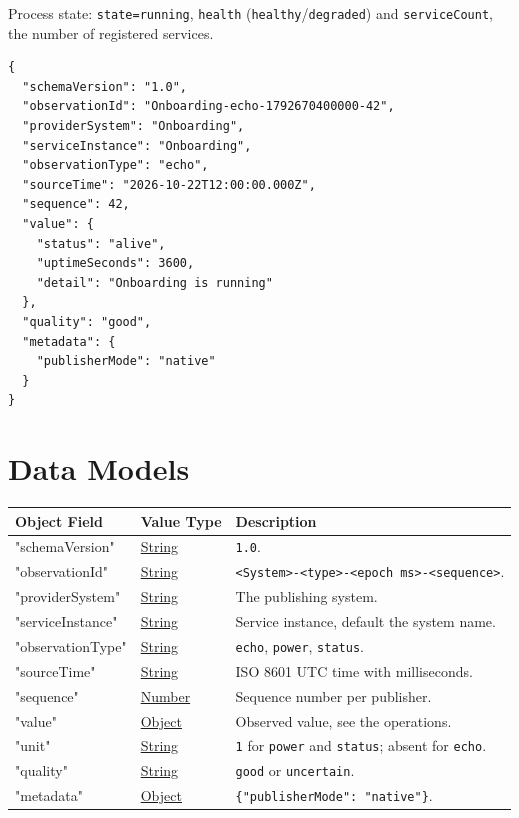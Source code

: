 \documentclass[a4paper]{arrowhead}
\newcommand{\oref}[1]{{\textcolor{ArrowheadBlue}{\hyperref[sec:operations:#1]{#1}}}}
\newcommand{\pref}[1]{{\textcolor{ArrowheadGrey}{\hyperref[sec:model:primitives:#1]{#1}}}}
\begin{document}
Process state: \texttt{state=\allowbreak{}running}, \texttt{health} (\texttt{healthy}/\texttt{degraded}) and \texttt{serviceCount}, the number of registered services.

\begin{lstlisting}[caption={An \oref{echo} observation.}]
{
  "schemaVersion": "1.0",
  "observationId": "Onboarding-echo-1792670400000-42",
  "providerSystem": "Onboarding",
  "serviceInstance": "Onboarding",
  "observationType": "echo",
  "sourceTime": "2026-10-22T12:00:00.000Z",
  "sequence": 42,
  "value": {
    "status": "alive",
    "uptimeSeconds": 3600,
    "detail": "Onboarding is running"
  },
  "quality": "good",
  "metadata": {
    "publisherMode": "native"
  }
}
\end{lstlisting}

\newpage

\section{Data Models}
\label{sec:model}


\noindent\begin{tabularx}{\textwidth}{| p{4.25cm} | p{3.5cm} | X |} \hline
\rowcolor{gray!33} Object Field & Value Type & Description \\ \hline
"schemaVersion" & \pref{String} & \texttt{1.0}. \\ \hline
"observationId" & \pref{String} & \texttt{<System>-<type>-<epoch ms>-<sequence>}. \\ \hline
"providerSystem" & \pref{String} & The publishing system. \\ \hline
"serviceInstance" & \pref{String} & Service instance, default the system name. \\ \hline
"observationType" & \pref{String} & \texttt{echo}, \texttt{power}, \texttt{status}. \\ \hline
"sourceTime" & \pref{String} & ISO 8601 UTC time with milliseconds. \\ \hline
"sequence" & \pref{Number} & Sequence number per publisher. \\ \hline
"value" & \pref{Object} & Observed value, see the operations. \\ \hline
"unit" & \pref{String} & \texttt{1} for \texttt{power} and \texttt{status}; absent for \texttt{echo}. \\ \hline
"quality" & \pref{String} & \texttt{good} or \texttt{uncertain}. \\ \hline
"metadata" & \pref{Object} & \texttt{\{"publisherMode": "native"\}}. \\ \hline
\end{tabularx}
\end{document}
